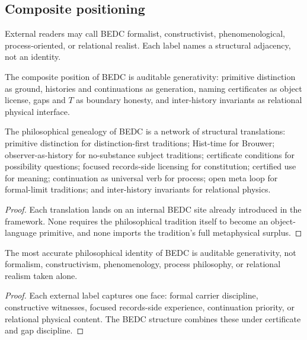 
\subsection{Composite positioning}
\label{subsec:philosophy-composite-positioning}

\begin{definition}
\label{def:philosophy-external-labels}
External readers may call BEDC formalist, constructivist,
phenomenological, process-oriented, or relational realist. Each label
names a structural adjacency, not an identity.
\end{definition}

\begin{definition}
\label{def:philosophy-composite-position}
The composite position of BEDC is auditable generativity: primitive
distinction as ground, histories and continuations as generation,
naming certificates as object license, gaps and \(T\) as boundary
honesty, and inter-history invariants as relational physical interface.
\end{definition}

\begin{theorem}
\label{thm:philosophy-genealogy-synthesis}
The philosophical genealogy of BEDC is a network of structural
translations:
primitive distinction for distinction-first traditions; Hist-time for
Brouwer; observer-as-history for no-substance subject traditions;
certificate conditions for possibility questions; focused records-side
licensing for constitution; certified use for meaning; continuation as
universal verb for process; open meta loop for formal-limit traditions;
and inter-history invariants for relational physics.
\end{theorem}
\begin{proof}
Each translation lands on an internal BEDC site already introduced in
the framework. None requires the philosophical tradition itself to
become an object-language primitive, and none imports the tradition's
full metaphysical surplus.
\end{proof}

\begin{corollary}
\label{cor:philosophy-bedc-philosophical-identity}
The most accurate philosophical identity of BEDC is auditable
generativity, not formalism, constructivism, phenomenology, process
philosophy, or relational realism taken alone.
\end{corollary}
\begin{proof}
Each external label captures one face: formal carrier discipline,
constructive witnesses, focused records-side experience, continuation
priority, or relational physical content. The BEDC structure combines
these under certificate and gap discipline.
\end{proof}

